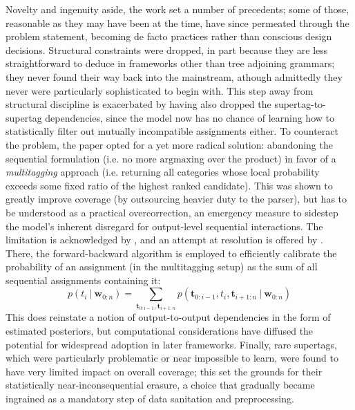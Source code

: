 Novelty and ingenuity aside, the work set a number of precedents; some of those, reasonable as they may have been at the time, have since permeated through the problem statement, becoming de facto practices rather than conscious design decisions.
Structural constraints were dropped, in part because they are less straightforward to deduce in frameworks other than tree adjoining grammars; they never found their way back into the mainstream, athough admittedly they never were particularly sophisticated to begin with.
This step away from structural discipline is exacerbated by having also dropped the supertag-to-supertag dependencies, since the model now has no chance of learning how to statistically filter out mutually incompatible assignments either.
To counteract the problem, the paper opted for a yet more radical solution: abandoning the sequential formulation (i.e. no more $\mathrm{argmax}$ing over the product) in favor of a \textit{multitagging} approach (i.e. returning all categories whose local probability exceeds some fixed ratio of the highest ranked candidate).
This was shown to greatly improve coverage (by outsourcing heavier duty to the parser), but has to be understood as a practical overcorrection, an emergency measure to sidestep the model's inherent disregard for output-level sequential interactions.
The limitation is acknowledged by \citet{clark-curran-2004-importance}, and an attempt at resolution is offered by \citet{curran2006multi}.
There, the forward-backward algorithm is employed to efficiently calibrate the probability of an assignment (in the multitagging setup) as the sum of all sequential assignments containing it:
\begin{equation}
	p(t_i \ | \ \mathbf{w}_{0:n}) = \sum_{\mathbf{t}_{0:i-1}, \mathbf{t}_{i+1:n}} p(\mathbf{t}_{0:i-1}, t_i, \mathbf{t}_{i+1:n} \ | \ \mathbf{w}_{0:n})
\end{equation}
This does reinstate a notion of output-to-output dependencies in the form of estimated posteriors, but computational considerations have diffused the potential for widespread adoption in later frameworks. 
Finally, rare supertags, which were particularly problematic or near impossible to learn, were found to have very limited impact on overall coverage; this set the grounds for their statistically near-inconsequential erasure, a choice that gradually became ingrained as a mandatory step of data sanitation and preprocessing.


